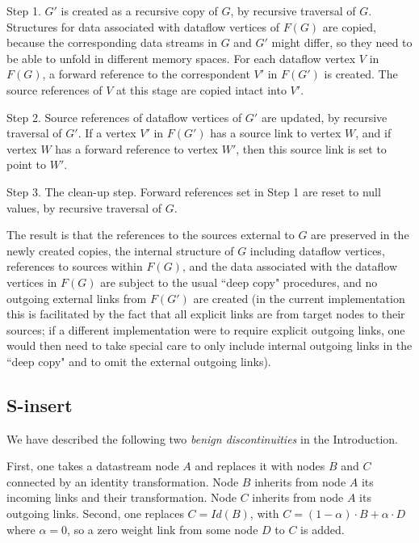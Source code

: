 \documentclass{llncs}
\begin{document}
Step 1. $G'$ is created as a recursive copy of $G$, by recursive traversal of $G$. Structures for data associated with dataflow vertices of $F(G)$ are copied, because
the corresponding data streams in $G$ and $G'$ might differ, so they need to be able to unfold in different memory spaces.
For each dataflow vertex $V$ in $F(G)$, a forward reference to the correspondent $V'$ in $F(G')$ is created.
The source references of $V$ at this stage are copied intact into $V'$. 

Step 2. Source references of dataflow vertices of $G'$ are updated, by recursive traversal of $G'$. If a vertex $V'$ in $F(G')$ has a source
link to vertex $W$, and if vertex $W$ has
a forward reference to vertex $W'$, then this source link is set to point to $W'$.

Step 3. The clean-up step.  Forward references set in Step 1 are reset to null values, by recursive traversal of $G$.

The result is that the references to the sources external to $G$ are preserved in the newly created copies, the internal structure of $G$ including dataflow vertices, 
references to sources within $F(G)$, and the data associated with the dataflow vertices in $F(G)$ are subject to the usual ``deep copy"
procedures, and no outgoing external links from $F(G')$ are created (in the current implementation this is facilitated by the fact that all explicit links
are from target nodes to their sources; if a different implementation were to require explicit outgoing links, one would then need to take
special care to only include internal outgoing links in the ``deep copy" and to omit the external outgoing links).  


\subsection{S-insert}\label{special_insert}

We have described the following two {\em benign discontinuities} in the Introduction.

 First,
one takes a datastream node $A$ and replaces it with nodes $B$ and $C$ connected by an identity transformation. Node $B$ inherits from node $A$ its
incoming links and their transformation. Node $C$ inherits from node $A$ its outgoing links. Second, one replaces $C=Id(B)$, with
$C= (1-\alpha)\cdot B + \alpha \cdot D$ where $\alpha = 0$, so a zero weight link from some node $D$ to $C$ is added. 
\end{document}
